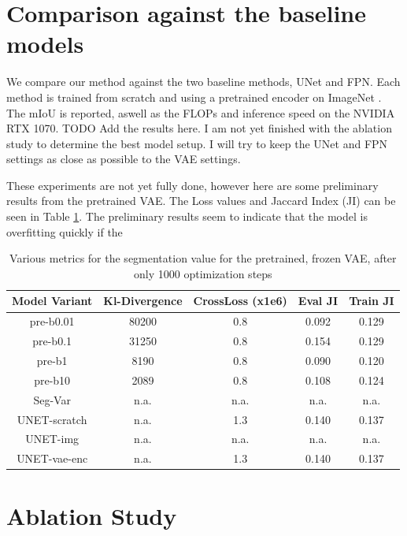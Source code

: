 \section{Comparison against the baseline models}
We compare our method against the two baseline methods, UNet and FPN. Each method is trained from scratch and using a pretrained encoder on ImageNet \cite{deng2009imagenet}. The mIoU is reported, aswell as the FLOPs and inference speed on the NVIDIA RTX 1070. 
TODO Add the results here. I am not yet finished with the ablation study to determine the best model setup. I will try to keep the UNet and FPN settings as close as possible to the VAE settings.

These experiments are not yet fully done, however here are some preliminary results from the pretrained VAE. The Loss values and Jaccard Index (JI) can be seen in Table \ref{tab:seg-vae}. The preliminary results seem to indicate that the model is overfitting quickly if the 

\begin{table}[!ht]
    \centering
    \caption{Various metrics for the segmentation value for the pretrained, frozen VAE, after only 1000 optimization steps}
    \label{tab:seg-vae}
    \begin{tabular}{ccccc}
        \hline
        Model Variant & Kl-Divergence & CrossLoss (x1e6) & Eval JI & Train JI \\
        \hline
        pre-b0.01     & 80200         & 0.8              & 0.092   & 0.129    \\
        pre-b0.1      & 31250         & 0.8              & 0.154   & 0.129    \\
        pre-b1        & 8190          & 0.8              & 0.090   & 0.120    \\
        pre-b10       & 2089          & 0.8              & 0.108   & 0.124    \\
        Seg-Var       & n.a.          & n.a.             & n.a.    & n.a.     \\
        UNET-scratch  & n.a.          & 1.3              & 0.140   & 0.137    \\
        UNET-img      & n.a.          & n.a.             & n.a.    & n.a.     \\
        UNET-vae-enc  & n.a.          & 1.3              & 0.140   & 0.137    \\
        \hline
    \end{tabular}
\end{table}


\section{Ablation Study}
